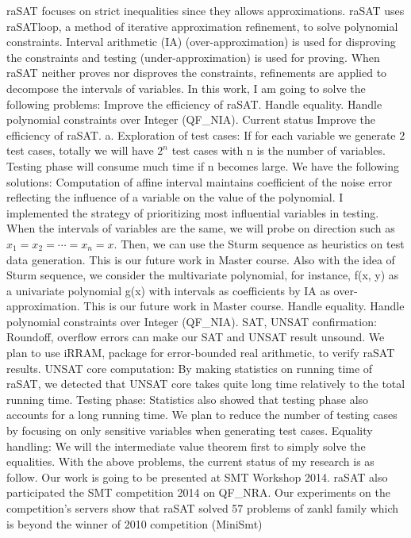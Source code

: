\documentclass[12pt]{article}
\begin{document}
raSAT focuses on strict inequalities since they allows approximations. raSAT uses raSATloop, a method of iterative approximation refinement, to solve polynomial constraints. Interval arithmetic (IA) (over-approximation) is used for disproving the constraints and testing (under-approximation) is used for proving. When raSAT neither proves nor disproves the constraints, refinements are applied to decompose the intervals of variables. 
In this work, I am going to solve the following problems:
Improve the efficiency of raSAT.
Handle equality.
Handle polynomial constraints over Integer (QF\_NIA).
Current status
Improve the efficiency of raSAT.
a. Exploration of test cases:
If for each variable we generate $2$ test cases, totally we will have $2^n$ test cases with n is the number of variables. Testing phase will consume much time if n becomes large. We have the following solutions:
Computation of affine interval maintains coefficient of the noise error reflecting the influence of a variable on the value of the polynomial. I implemented the strategy of prioritizing most influential variables in testing.
When the intervals of variables are the same, we will probe on direction such as $x_1=x_2=⋯=x_n=x$. Then, we can use the Sturm sequence as heuristics on test data generation. This is our future work in Master course. 
Also with the idea of Sturm sequence, we consider the multivariate polynomial, for instance, f(x, y) as a univariate polynomial g(x) with intervals as coefficients by IA as over-approximation. This is our future work in Master course.
Handle equality.
Handle polynomial constraints over Integer (QF\_NIA).
SAT, UNSAT confirmation: Roundoff, overflow errors can make our SAT and UNSAT result unsound. We plan to use iRRAM, package for error-bounded real arithmetic, to verify raSAT results.
UNSAT core computation: By making statistics on running time of raSAT, we detected that UNSAT core takes quite long time relatively to the total running time. 
Testing phase: Statistics also showed that testing phase also accounts for a long running time. We plan to reduce the number of testing cases by focusing on only sensitive variables when generating test cases.
Equality handling: We will the intermediate value theorem first to simply solve the equalities.
With the above problems, the current status of my research is as follow.
Our work is going to be presented at SMT Workshop 2014. raSAT also participated the SMT competition 2014 on QF\_NRA. Our experiments on the competition’s servers show that raSAT solved 57 problems of zankl family which is beyond the winner of 2010 competition (MiniSmt)
\end{document}
